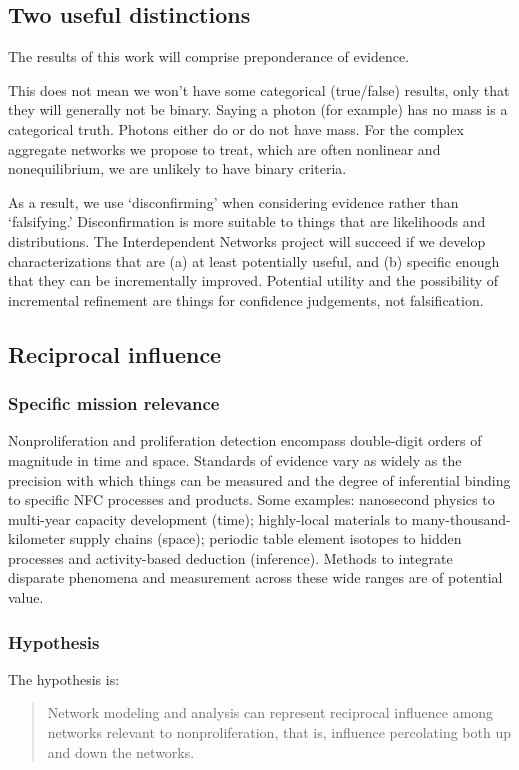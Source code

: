 \documentclass{article} %
\begin{document}
\subsection{Two useful distinctions}
The results of this work will comprise preponderance of evidence.

This does not mean we won't have some categorical (true/false) results, only that they will generally not be binary. Saying a photon (for example) has no mass is a  categorical truth. Photons either do or do not have mass. For the complex aggregate networks we propose to treat, which are often nonlinear and nonequilibrium, we are unlikely to have binary criteria.

As a result, we use `disconfirming' when considering evidence rather than `falsifying.' Disconfirmation is more suitable to things that are likelihoods and distributions. The Interdependent Networks project will succeed if we develop characterizations that are (a) at least potentially useful, and (b) specific enough that they can be incrementally improved. Potential utility and the possibility of incremental refinement are things for confidence judgements, not falsification.

\pagebreak
\subsection{Reciprocal influence}
\subsubsection{Specific mission relevance}

Nonproliferation and proliferation detection encompass double-digit orders of magnitude in time and space. Standards of evidence vary as widely as the precision with which things can be measured and the degree of inferential binding to specific NFC processes and products. Some examples: nanosecond physics to multi-year capacity development (time); highly-local materials to many-thousand-kilometer supply chains (space); periodic table element isotopes to hidden processes and activity-based deduction (inference). Methods to integrate disparate phenomena and measurement across these wide ranges are of potential value. 

\subsubsection{Hypothesis}
The hypothesis is:
\begin{quote}
Network modeling and analysis can represent reciprocal influence among networks relevant to nonproliferation, that is, influence percolating both up and down the networks.
\end{quote}
\end{document}
